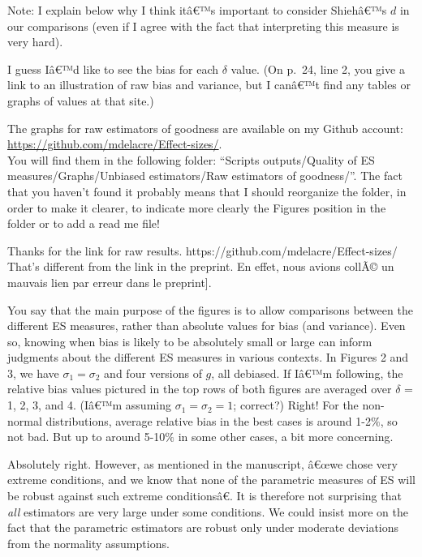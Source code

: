 \begin{appendix}
Note: I explain below why I think itâ€™s important to consider Shiehâ€™s
\(d\) in our comparisons (even if I agree with the fact that
interpreting this measure is very hard).

\color{black} I guess Iâ€™d like to see the bias for each \(\delta\)
value. (On p.~24, line 2, you give a link to an illustration of raw bias
and variance, but I canâ€™t find any tables or graphs of values at that
site.)

\color{blue} The graphs for raw estimators of goodness are available on
my Github account:\\
\underline{https://github.com/mdelacre/Effect-sizes/}.\\
You will find them in the following folder: ``Scripts outputs/Quality of
ES measures/Graphs/Unbiased estimators/Raw estimators of goodness/''.
The fact that you haven't found it probably means that I should
reorganize the folder, in order to make it clearer, to indicate more
clearly the Figures position in the folder or to add a read me file!

\color{brown} Thanks for the link for raw results.
https://github.com/mdelacre/Effect-sizes/ That's different from the link
in the preprint. \color{darkgray}{[}En effet, nous avions collÃ© un
mauvais lien par erreur dans le preprint{]}.

\color{black} You say that the main purpose of the figures is to allow
comparisons between the different ES measures, rather than absolute
values for bias (and variance). Even so, knowing when bias is likely to
be absolutely small or large can inform judgments about the different ES
measures in various contexts. In Figures 2 and 3, we have
\(\sigma_1=\sigma_2\) and four versions of \(g\), all debiased. If Iâ€™m
following, the relative bias values pictured in the top rows of both
figures are averaged over \(\delta\) = 1, 2, 3, and 4. (Iâ€™m assuming
\(\sigma_1=\sigma_2=1\); correct?) \color{blue} Right! \color{black} For
the non-normal distributions, average relative bias in the best cases is
around 1-2\(\%\), so not bad. But up to around 5-10\(\%\) in some other
cases, a bit more concerning.

\color{blue} Absolutely right. However, as mentioned in the manuscript,
â€œwe chose very extreme conditions, and we know that none of the
parametric measures of ES will be robust against such extreme
conditionsâ€. It is therefore not surprising that \emph{all} estimators
are very large under some conditions. We could insist more on the fact
that the parametric estimators are robust only under moderate deviations
from the normality assumptions.


\end{appendix}
